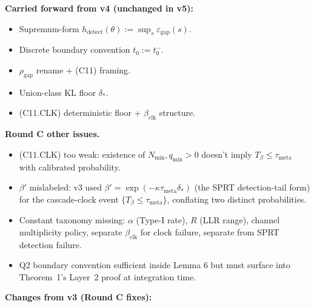 \documentclass{article}
\newcommand{\deltastar}{\delta_{*}}
\newcommand{\rhogap}{\rho_{\mathrm{gap}}}
\newcommand{\epsgap}{\varepsilon_{\mathrm{gap}}}
\newcommand{\Tbeta}{T_{\beta}}
\newcommand{\bclk}{\beta_{\mathrm{clk}}}
\begin{document}
\textbf{Carried forward from v4 (unchanged in v5):}
\begin{itemize}
\item Supremum-form $h_{\mathrm{detect}}(\theta) := \sup_s
  \epsgap(s)$.
\item Discrete boundary convention $t_0 := t_0^-$.
\item $\rhogap$ rename + (C11) framing.
\item Union-class KL floor $\deltastar$.
\item (C11.CLK) deterministic floor + $\bclk$ structure.
\end{itemize}

\textbf{Round C other issues.}
\begin{itemize}
\item (C11.CLK) too weak: existence of $N_{\min}, q_{\min} > 0$
  doesn't imply $\Tbeta \leq \tau_{\mathrm{meta}}$ with calibrated
  probability.
\item $\beta'$ mislabeled: v3 used $\beta' = \exp(-\kappa
  \tau_{\mathrm{meta}} \deltastar)$ (the SPRT detection-tail form)
  for the cascade-clock event $\{\Tbeta \leq \tau_{\mathrm{meta}}\}$,
  conflating two distinct probabilities.
\item Constant taxonomy missing: $\alpha$ (Type-I rate), $R$ (LLR
  range), channel multiplicity policy, separate $\bclk$ for clock
  failure, separate from SPRT detection failure.
\item Q2 boundary convention sufficient inside Lemma 6 but must
  surface into Theorem~1's Layer~2 proof at integration time.
\end{itemize}

\textbf{Changes from v3 (Round C fixes):}
\end{document}
